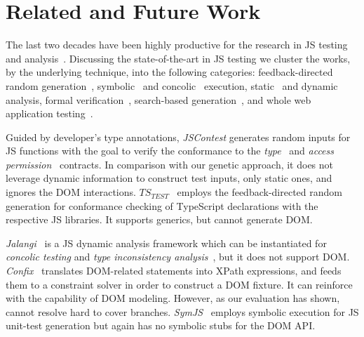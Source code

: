 \section{Related and Future Work}
\label{sec:related.work}

The last two decades have been highly productive for the research in JS testing and analysis~\cite{andreasen2017survey, sun2017analysis, mesbah2015advances}. Discussing the state-of-the-art in JS testing we cluster the works, by the underlying technique, into the following categories: feedback-directed random generation~\cite{heidegger2010contract,heidegger2012jscontest,kristensen2017type}, symbolic~\cite{tanida2014automatic,saxena2010symbolic} and concolic~\cite{sen2013jalangi,amin:ase15} execution, static~\cite{tajs2009,dom2011} and dynamic~\cite{andreasen2017survey} analysis, formal verification~\cite{gardner2008local,lerner2012modeling,gardner2012towards}, search-based generation~\cite{alshraideh2008complete}, and whole web application testing~\cite{alshahwan2011automated,mesbah2012invariant,milani2014leveraging}.

Guided by developer's type annotations, \emph{JSContest} generates random inputs for JS functions with the goal to verify the conformance to the \emph{type}~\cite{heidegger2010contract} and \emph{access permission}~\cite{heidegger2012jscontest} contracts. In comparison with our genetic approach, it does not leverage dynamic information to construct test inputs, only static ones, and ignores the DOM interactions. $TS_{TEST}$~\cite{kristensen2017type} employs the feedback-directed random generation for conformance checking of TypeScript declarations with the respective JS libraries. It supports generics, but cannot generate DOM.


\emph{Jalangi}~\cite{sen2013jalangi} is a JS dynamic analysis framework which can be instantiated for \emph{concolic testing} and \emph{type inconsistency analysis}~\cite{pradel2015typedevil}, but it does not support DOM. \emph{Confix}~\cite{amin:ase15} translates DOM-related statements into XPath expressions, and feeds them to a constraint solver in order to construct a DOM fixture. It can reinforce \Jalangi with the capability of DOM modeling. However, as our evaluation has shown, \Confix cannot resolve hard to cover branches. \emph{SymJS}~\cite{tanida2014automatic} employs symbolic execution for JS unit-test generation but again has no symbolic stubs for the DOM API.

